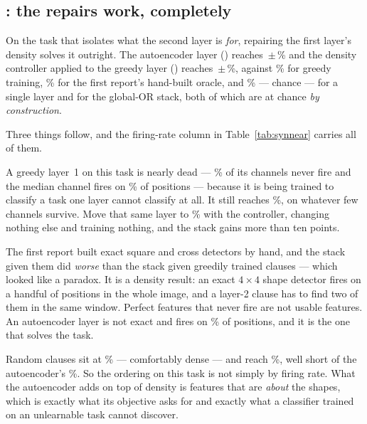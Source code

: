 \subsection{\texorpdfstring{}{near}: the repairs work, completely}
\label{sec:near}

\begin{ttkey}
On the task that isolates what the second layer is \emph{for}, repairing the first layer's
density solves it outright. The autoencoder layer (\ideaA) reaches
\synNearAutoAuto\,$\pm$\,\synsdNearAutoAuto{}\% and the density controller applied to the
greedy layer (\ideaB) reaches \synNearCalibTask\,$\pm$\,\synsdNearCalibTask{}\%, against
\synNearMctmTask{}\% for greedy training, \synNearMctmOracleSixFour{}\% for the first report's
hand-built oracle, and \synNearSingleTask{}\% --- chance --- for a single layer and for the
global-OR stack, both of which are at chance \emph{by construction}.
\end{ttkey}

Three things follow, and the firing-rate column in Table~\ref{tab:synnear} carries all of them.

 A
greedy layer~1 on this task is nearly dead --- \syndeadNearMctmTask{}\% of its channels never
fire and the median channel fires on \synfireNearMctmTask{}\% of positions --- because it is
being trained to classify a task one layer cannot classify at all. It still reaches
\synNearMctmTask{}\%, on whatever few channels survive. Move that same layer to
\synfireNearCalibTask{}\% with the controller, changing nothing else and training nothing, and
the stack gains more than ten points.

 The first report built exact
square and cross detectors by hand, and the stack given them did \emph{worse} than the stack
given greedily trained clauses --- which looked like a paradox. It is a density result: an
exact $4\times4$ shape detector fires on a handful of positions in the whole image, and a
layer-2 clause has to find two of them in the same window. Perfect features that never fire
are not usable features. An autoencoder layer is not exact and fires on
\synfireNearAutoAuto{}\% of positions, and it is the one that solves the task.

 Random clauses sit at
\synfireNearRandomRandom{}\% --- comfortably dense --- and reach \synNearRandomRandom{}\%, well
short of the autoencoder's \synNearAutoAuto{}\%. So the ordering on this task is not simply by
firing rate. What the autoencoder adds on top of density is features that are \emph{about} the
shapes, which is exactly what its objective asks for and exactly what a classifier trained on
an unlearnable task cannot discover.

